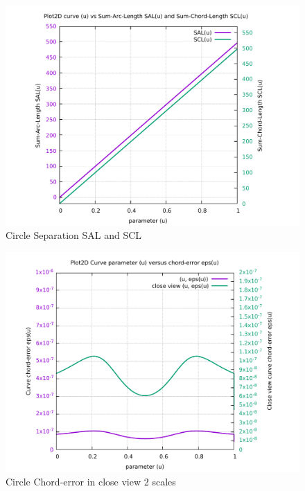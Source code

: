 \begin{figure}
	\caption     {Circle Separation SAL and SCL}
	\label{08-img-Circle-Separation-SAL-and-SCL.pdf}
	\includegraphics[width=1.00\textwidth]{Chap4/appendix/app-Circle/plots/08-img-Circle-Separation-SAL-and-SCL.pdf}
\end{figure}

\clearpage
\pagebreak

\begin{figure}
	\caption     {Circle Chord-error in close view 2 scales}
	\label{09-img-Circle-Chord-error-in-close-view-2-scales.pdf}
	\includegraphics[width=1.00\textwidth]{Chap4/appendix/app-Circle/plots/09-img-Circle-Chord-error-in-close-view-2-scales.pdf}
\end{figure}


